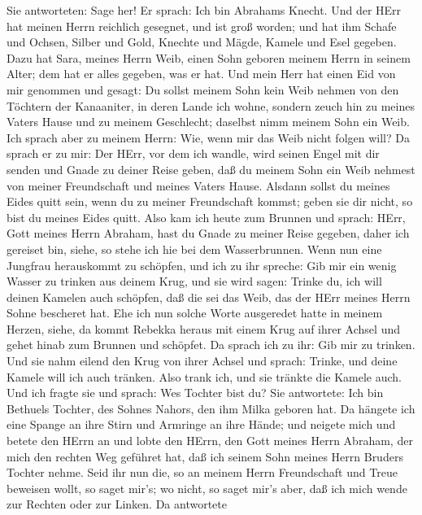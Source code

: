 Sie antworteten: Sage her!  Er sprach: Ich bin Abrahams
Knecht.  Und der HErr hat meinen Herrn reichlich gesegnet,
und ist groß worden; und hat ihm Schafe und Ochsen, Silber und Gold,
Knechte und Mägde, Kamele und Esel gegeben.  Dazu hat Sara,
meines Herrn Weib, einen Sohn geboren meinem Herrn in seinem Alter; dem
hat er alles gegeben, was er hat.  Und mein Herr hat einen
Eid von mir genommen und gesagt: Du sollst meinem Sohn kein Weib nehmen
von den Töchtern der Kanaaniter, in deren Lande ich wohne, 
sondern zeuch hin zu meines Vaters Hause und zu meinem Geschlecht;
daselbst nimm meinem Sohn ein Weib.  Ich sprach aber zu
meinem Herrn: Wie, wenn mir das Weib nicht folgen will?  Da
sprach er zu mir: Der HErr, vor dem ich wandle, wird seinen Engel mit
dir senden und Gnade zu deiner Reise geben, daß du meinem Sohn ein Weib
nehmest von meiner Freundschaft und meines Vaters Hause. 
Alsdann sollst du meines Eides quitt sein, wenn du zu meiner
Freundschaft kommst; geben sie dir nicht, so bist du meines Eides quitt.
 Also kam ich heute zum Brunnen und sprach: HErr, Gott
meines Herrn Abraham, hast du Gnade zu meiner Reise gegeben, daher ich
gereiset bin,  siehe, so stehe ich hie bei dem
Wasserbrunnen. Wenn nun eine Jungfrau herauskommt zu schöpfen, und ich
zu ihr spreche: Gib mir ein wenig Wasser zu trinken aus deinem Krug,
 und sie wird sagen: Trinke du, ich will deinen Kamelen
auch schöpfen, daß die sei das Weib, das der HErr meines Herrn Sohne
bescheret hat.  Ehe ich nun solche Worte ausgeredet hatte
in meinem Herzen, siehe, da kommt Rebekka heraus mit einem Krug auf
ihrer Achsel und gehet hinab zum Brunnen und schöpfet. Da sprach ich zu
ihr: Gib mir zu trinken.  Und sie nahm eilend den Krug von
ihrer Achsel und sprach: Trinke, und deine Kamele will ich auch tränken.
Also trank ich, und sie tränkte die Kamele auch.  Und ich
fragte sie und sprach: Wes Tochter bist du? Sie antwortete: Ich bin
Bethuels Tochter, des Sohnes Nahors, den ihm Milka geboren hat. Da
hängete ich eine Spange an ihre Stirn und Armringe an ihre Hände;
 und neigete mich und betete den HErrn an und lobte den
HErrn, den Gott meines Herrn Abraham, der mich den rechten Weg geführet
hat, daß ich seinem Sohn meines Herrn Bruders Tochter nehme.
 Seid ihr nun die, so an meinem Herrn Freundschaft und
Treue beweisen wollt, so saget mir's; wo nicht, so saget mir's aber, daß
ich mich wende zur Rechten oder zur Linken.  Da antwortete
